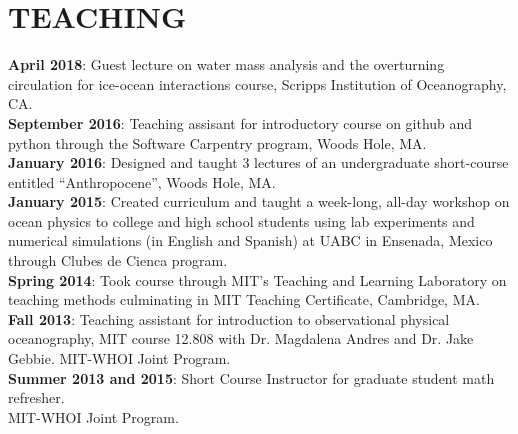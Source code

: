 \documentclass[paper=letter,fontsize=11pt]{scrartcl} %
\newcommand{\NewPart}[2]{\section*{\uppercase{#1} #2}}
\newcommand{\ShortEntry}[2]{\normalsize \noindent \textbf{#1}: #2 \\ }
\begin{document}
\NewPart{Teaching}{}

\ShortEntry{April 2018}{Guest lecture on water mass analysis and the overturning circulation for ice-ocean interactions course, Scripps Institution of Oceanography, CA.}

\ShortEntry{September 2016}{Teaching assisant for introductory course on github and python through the Software Carpentry program, Woods Hole, MA.}

\ShortEntry{January 2016}{Designed and taught 3 lectures of an undergraduate short-course entitled ``Anthropocene'', Woods Hole, MA.}

\ShortEntry{January 2015}{Created curriculum and taught a week-long, all-day workshop on ocean physics to college and high school students using lab experiments and numerical simulations (in English and Spanish) at UABC in Ensenada, Mexico through Clubes de Cienca program.}

\ShortEntry{Spring 2014}{Took course through MIT's Teaching and Learning Laboratory on teaching methods culminating in MIT Teaching Certificate, Cambridge, MA.}

\ShortEntry{Fall 2013}{Teaching assistant for introduction to observational physical oceanography, MIT course 12.808 with Dr. Magdalena Andres and Dr. Jake Gebbie. MIT-WHOI Joint Program.}

\ShortEntry{Summer 2013 and 2015}{Short Course Instructor for graduate student math refresher.\\ MIT-WHOI Joint Program.}
\end{document}
